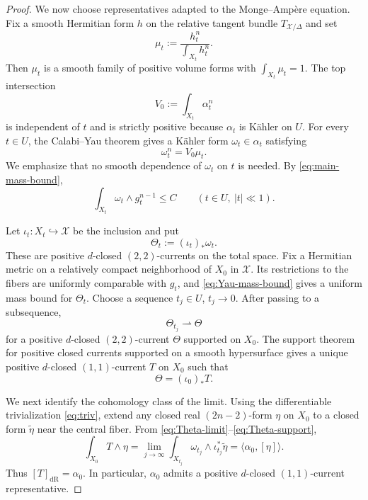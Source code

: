 \documentclass[11pt,letterpaper]{amsart}
\numberwithin{equation}{section}
\newcommand{\cal}{\mathcal}
\def\cX{{\cal X}}
\begin{document}
\begin{proof}
We now choose representatives adapted to the Monge--Amp\`ere equation. Fix a smooth Hermitian form
$h$ on the relative tangent bundle $T_{\cX/\Delta}$ and set
\[
 \mu_t:=\frac{h_t^n}{\int_{X_t}h_t^n}.
\]
Then $\mu_t$ is a smooth family of positive volume forms with
$\int_{X_t}\mu_t=1$. The top intersection
\begin{equation}\label{eq:main-V0}
 V_0:=\int_{X_t}\alpha_t^n
\end{equation}
is independent of $t$ and is strictly positive because $\alpha_t$ is K\"ahler
on $U$. For every $t\in U$, the Calabi--Yau theorem \cite{Yau} gives a K\"ahler
form $\omega_t\in\alpha_t$ satisfying
\begin{equation}\label{eq:Yau-normalization}
 \omega_t^n=V_0\mu_t.
\end{equation}
We emphasize that no smooth dependence of $\omega_t$ on $t$ is needed. By
\eqref{eq:main-mass-bound},
\begin{equation}\label{eq:Yau-mass-bound}
 \int_{X_t}\omega_t\wedge g_t^{n-1}\le C
 \qquad(t\in U,\ |t|\ll1).
\end{equation}

Let $\iota_t:X_t\hookrightarrow\cX$ be the inclusion and put
\[
 \Theta_t:=(\iota_t)_*\omega_t.
\]
These are positive $d$-closed $(2,2)$-currents on the total space. Fix a
Hermitian metric on a relatively compact neighborhood of $X_0$ in $\cX$.
Its restrictions to the fibers are uniformly comparable with $g_t$, and
\eqref{eq:Yau-mass-bound} gives a uniform mass bound for $\Theta_t$. Choose a
sequence $t_j\in U$, $t_j\to0$. After passing to a subsequence,
\begin{equation}\label{eq:Theta-limit}
 \Theta_{t_j}\rightharpoonup\Theta
\end{equation}
for a positive $d$-closed $(2,2)$-current $\Theta$ supported on $X_0$. The
support theorem for positive closed currents supported on a smooth
hypersurface gives a unique positive $d$-closed $(1,1)$-current $T$ on $X_0$
such that
\begin{equation}\label{eq:Theta-support}
 \Theta=(\iota_0)_*T.
\end{equation}

We next identify the cohomology class of the limit. Using the differentiable trivialization
\eqref{eq:triv}, extend any closed real $(2n-2)$-form $\eta$ on $X_0$ to a
closed form $\widetilde\eta$ near the central fiber. From
\eqref{eq:Theta-limit}--\eqref{eq:Theta-support},
\[
 \int_{X_0}T\wedge\eta
 =\lim_{j\to\infty}
 \int_{X_{t_j}}\omega_{t_j}\wedge\iota_{t_j}^*\widetilde\eta
 =\langle\alpha_0,[\eta]\rangle.
\]
Thus $[T]_{\mathrm{dR}}=\alpha_0$. In particular, $\alpha_0$ admits a positive $d$-closed $(1,1)$-current representative.


\end{proof}
\end{document}
